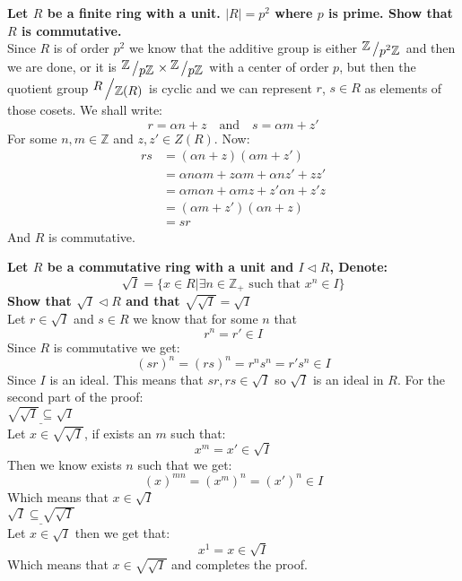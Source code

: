 \documentclass{article}
\theoremstyle{plain}
\DeclareMathOperator{\idealin}{\triangleleft}
\newcommand{\Z}{\mathbb{Z}}
\newcommand{\bigslant}[2]
{{\raisebox{.2em}{$#1$}\left/\raisebox{-.2em}{$#2$}\right.}}
\begin{document}
	\newpage
	
	\textbf{Let $R$ be a finite ring with a unit. $\vert R \vert = p^2$ where 
	$p$ is prime. Show that $R$ is commutative.} \\
	Since $R$ is of order $p^2$ we know that the additive group is either
	$\bigslant{\Z}{p^2\Z}$ and then we are done, or it is 
	$\bigslant{\Z}{p\Z} \times \bigslant{\Z}{p\Z}$ with a center of order
	$p$, but then the quotient group $\bigslant{R}{\Z(R)}$ is cyclic
	and we can represent $r$, $s\in R$ as elements of those cosets. 
	We shall write:
	\[
		r = \alpha n + z \quad \text{and} \quad s = \alpha m + z'
	\]
	For some $n,m\in\Z$ and $z,z'\in Z(R)$. Now:
	\begin{align*}
		rs &= (\alpha n + z)(\alpha m + z')\\
		   &= \alpha n \alpha m + z \alpha m + \alpha n z' + zz' \\
		   &= \alpha m \alpha n + \alpha m z + z' \alpha n + z'z \\
		   &= (\alpha m + z')(\alpha n + z) \\
		   &= sr
	\end{align*}
	And $R$ is commutative.
	
	\newpage
	
	\textbf{Let $R$ be a commutative ring with a unit and $I\idealin R$, 
	Denote: 
	\[ 
		\sqrt{I} = \{x\in R \vert \exists n\in\Z_+ 
	\text{ such that } x^n\in I\}
	\]
	Show that $\sqrt{I}\idealin R$ and that $\sqrt{\sqrt{I}} = \sqrt{I}$} \\
	Let $r\in\sqrt{I}$ and $s\in R$ we know that for some $n$ that
	\[
		r^n = r' \in I
	\]
	Since $R$ is commutative we get:
	\[
		(sr)^n = (rs)^n = r^n s^n = r' s^n \in I
	\]
	Since $I$ is an ideal. This means that $sr,rs\in\sqrt{I}$ so $\sqrt{I}$
	is an ideal in $R$. For the second part of the proof: 
  \phantom{} \\
	$\underline{\sqrt{\sqrt{I}} \subseteq \sqrt{I}}$ \\
	Let $x\in\sqrt{\sqrt{I}}$, if exists an $m$ such that:
	\[
		x^m = x'\in\sqrt{I}
	\]
	Then we know exists $n$ such that we get:
	\[
		(x)^{mn} = (x^m)^n = (x')^n \in I
	\]
	Which means that $x\in\sqrt{I}$ 
  \phantom{} \\
	$\underline{\sqrt{I} \subseteq \sqrt{\sqrt{I}}}$ \\
	Let $x\in\sqrt{I}$ then we get that:
	\[
		x^1 = x \in \sqrt{I}
	\]
	Which means that $x\in\sqrt{\sqrt{I}}$ and completes the proof.
	
	\newpage
	
\end{document}
